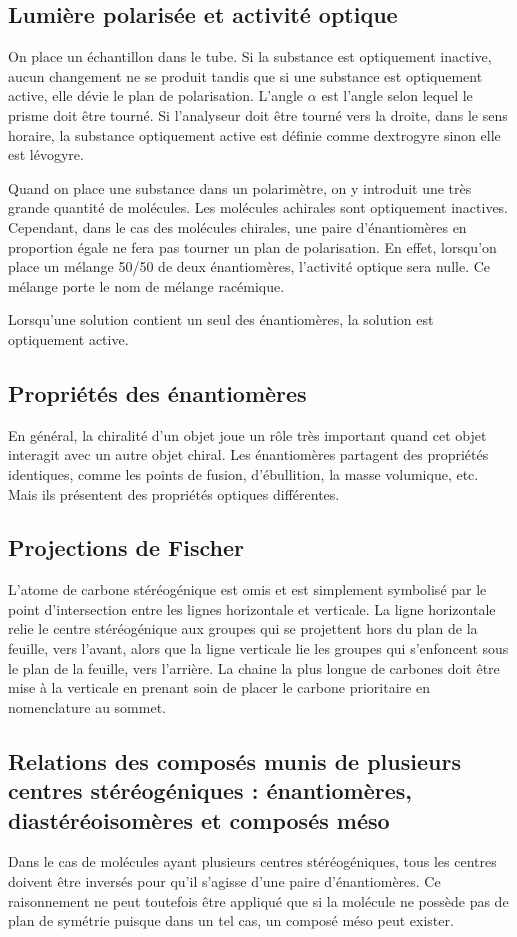 \subsection{Lumière polarisée et activité optique}On place un échantillon dans le tube.
Si la substance est optiquement inactive, aucun changement ne se produit tandis que si une substance est optiquement active, elle dévie le plan de polarisation.
L'angle $\alpha$ est l'angle selon lequel le prisme doit être tourné.
Si l'analyseur doit être tourné vers la droite, dans le sens horaire, la substance optiquement active est définie comme dextrogyre sinon elle est lévogyre.

Quand on place une substance dans un polarimètre, on y introduit une très grande quantité de molécules.
Les molécules achirales sont optiquement inactives.
Cependant, dans le cas des molécules chirales, une paire d'énantiomères en proportion égale ne fera pas tourner un plan de polarisation.
En effet, lorsqu'on place un mélange 50/50 de deux énantiomères, l'activité optique sera nulle.
Ce mélange porte le nom de mélange racémique.

Lorsqu'une solution contient un seul des énantiomères, la solution est optiquement active.

\subsection{Propriétés des énantiomères} En général, la chiralité d'un objet joue un rôle très important quand cet objet interagit avec un autre objet chiral.
Les énantiomères partagent des propriétés identiques, comme les points de fusion, d'ébullition, la masse volumique, etc.
Mais ils présentent des propriétés optiques différentes.

\subsection{Projections de Fischer}
L'atome de carbone stéréogénique est omis et est simplement symbolisé par le point d'intersection entre les lignes horizontale et verticale.
La ligne horizontale relie le centre stéréogénique aux groupes qui se projettent hors du plan de la feuille, vers l'avant, alors que la ligne verticale lie les groupes qui s'enfoncent sous le plan de la feuille, vers l'arrière.
La chaine la plus longue de carbones doit être mise à la verticale en prenant soin de placer le carbone prioritaire en nomenclature au sommet.

\subsection{Relations des composés munis de plusieurs centres stéréogéniques : énantiomères, diastéréoisomères et composés méso} Dans le cas de molécules ayant plusieurs centres stéréogéniques, tous les centres doivent être inversés pour qu'il s'agisse d'une paire d'énantiomères.
Ce raisonnement ne peut toutefois être appliqué que si la molécule ne possède pas de plan de symétrie puisque dans un tel cas, un composé méso peut exister.

